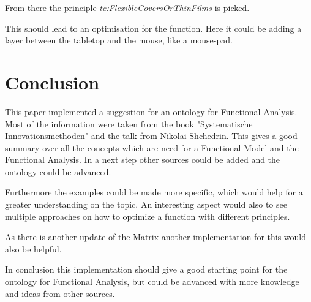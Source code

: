 \documentclass[11pt,a4paper]{article}
\begin{document}
From there the principle \textit{tc:FlexibleCoversOrThinFilms} is picked.

This should lead to an optimisation for the function.  Here it could be adding
a layer between the tabletop and the mouse, like a mouse-pad.

\section{Conclusion}
\label{sec:conclusion}

This paper implemented a suggestion for an ontology for Functional Analysis.
Most of the information were taken from the book "Systematische
Innovationsmethoden" and the talk from Nikolai Shchedrin.  This gives a good
summary over all the concepts which are need for a Functional Model and the
Functional Analysis.  In a next step other sources could be added and the
ontology could be advanced.

Furthermore the examples could be made more specific, which would help for a
greater understanding on the topic.  An interesting aspect would also to see
multiple approaches on how to optimize a function with different principles.

As there is another update of the Matrix another implementation for this would
also be helpful.

In conclusion this implementation should give a good starting point for the
ontology for Functional Analysis, but could be advanced with more knowledge
and ideas from other sources.
\end{document}
